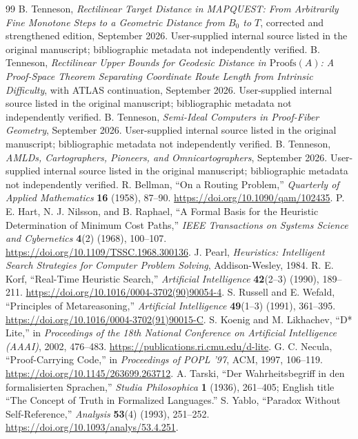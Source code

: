 \documentclass[11pt]{article}
\theoremstyle{definition}
\theoremstyle{remark}
\begin{document}
\begin{thebibliography}{99}
 B. Tenneson, \emph{Rectilinear Target Distance in MAPQUEST: From Arbitrarily Fine Monotone Steps to a Geometric Distance from $B_0$ to $T$}, corrected and strengthened edition, September 2026. User-supplied internal source listed in the original manuscript; bibliographic metadata not independently verified.
 B. Tenneson, \emph{Rectilinear Upper Bounds for Geodesic Distance in $\mathrm{Proofs}(A)$: A Proof-Space Theorem Separating Coordinate Route Length from Intrinsic Difficulty}, with ATLAS continuation, September 2026. User-supplied internal source listed in the original manuscript; bibliographic metadata not independently verified.
 B. Tenneson, \emph{Semi-Ideal Computers in Proof-Fiber Geometry}, September 2026. User-supplied internal source listed in the original manuscript; bibliographic metadata not independently verified.
 B. Tenneson, \emph{AMLDs, Cartographers, Pioneers, and Omnicartographers}, September 2026. User-supplied internal source listed in the original manuscript; bibliographic metadata not independently verified.
 R. Bellman, ``On a Routing Problem,'' \emph{Quarterly of Applied Mathematics} \textbf{16} (1958), 87--90. \url{https://doi.org/10.1090/qam/102435}.
 P. E. Hart, N. J. Nilsson, and B. Raphael, ``A Formal Basis for the Heuristic Determination of Minimum Cost Paths,'' \emph{IEEE Transactions on Systems Science and Cybernetics} \textbf{4}(2) (1968), 100--107. \url{https://doi.org/10.1109/TSSC.1968.300136}.
 J. Pearl, \emph{Heuristics: Intelligent Search Strategies for Computer Problem Solving}, Addison-Wesley, 1984.
 R. E. Korf, ``Real-Time Heuristic Search,'' \emph{Artificial Intelligence} \textbf{42}(2--3) (1990), 189--211. \url{https://doi.org/10.1016/0004-3702(90)90054-4}.
 S. Russell and E. Wefald, ``Principles of Metareasoning,'' \emph{Artificial Intelligence} \textbf{49}(1--3) (1991), 361--395. \url{https://doi.org/10.1016/0004-3702(91)90015-C}.
 S. Koenig and M. Likhachev, ``D* Lite,'' in \emph{Proceedings of the 18th National Conference on Artificial Intelligence (AAAI)}, 2002, 476--483. \url{https://publications.ri.cmu.edu/d-lite}.
 G. C. Necula, ``Proof-Carrying Code,'' in \emph{Proceedings of POPL '97}, ACM, 1997, 106--119. \url{https://doi.org/10.1145/263699.263712}.
 A. Tarski, ``Der Wahrheitsbegriff in den formalisierten Sprachen,'' \emph{Studia Philosophica} \textbf{1} (1936), 261--405; English title ``The Concept of Truth in Formalized Languages.''
 S. Yablo, ``Paradox Without Self-Reference,'' \emph{Analysis} \textbf{53}(4) (1993), 251--252. \url{https://doi.org/10.1093/analys/53.4.251}.
\end{thebibliography}
\end{document}
